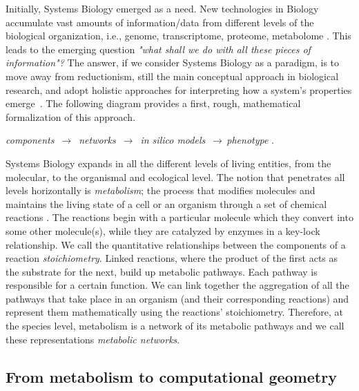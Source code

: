    Initially, Systems Biology emerged as a need. New technologies in Biology
   accumulate vast amounts of information/data from different levels of the
   biological organization, i.e., genome, transcriptome, proteome, metabolome
   \citep{quinn2016sample}. This leads to the emerging question \textit{"what shall
   we do with all these pieces of information"?} The answer, if we consider
   Systems Biology as a paradigm, is to move away from reductionism, still the main
   conceptual approach in biological research, and adopt holistic approaches for
   interpreting how a system's properties emerge~\citep{noble2008music}. The
   following diagram provides a first, rough, mathematical formalization of this
   approach.

   \begin{center}
   \textit{components} $\,\to\,$ \textit{networks} $\,\to\,$ \textit{in silico models} $\,\to\,$\textit{phenotype} \citep{palsson2015systems}. \\ \end{center}

   Systems Biology expands in all the different levels of living entities, from the
   molecular, to the organismal and ecological level. The notion that
   penetrates all levels horizontally is \emph{metabolism}; the
   process that modifies molecules and  maintains the living state of a
   cell or an organism through a set of chemical reactions
   \citep{schramski2015metabolic}. The reactions begin with a particular molecule
   which they convert into some other molecule(s), while they are catalyzed by
   enzymes in a key-lock relationship.
   We call the quantitative relationships between the components of a reaction   \emph{stoichiometry}.
   Linked reactions, where the product of the first acts as the substrate for the
   next, build up metabolic pathways. Each pathway is responsible for a certain
   function. We can link together the aggregation of all the pathways that take
   place in an organism (and their corresponding reactions)
   and represent them mathematically using  the reactions' stoichiometry.
   Therefore, at the species level, metabolism is a network of its metabolic pathways and we call
   these representations \emph{metabolic networks}.

   \subsection{From metabolism to computational geometry}


